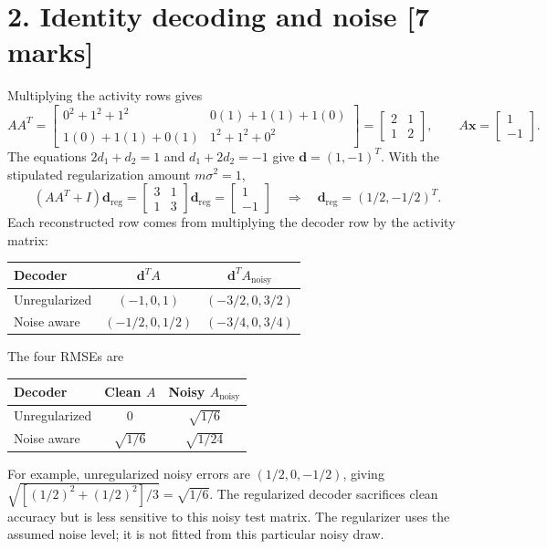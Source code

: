 \documentclass[10pt,letterpaper]{article}
\newcommand{\vct}[1]{\boldsymbol{#1}}
\begin{document}
\section*{2. Identity decoding and noise [7 marks]}
Multiplying the activity rows gives
\[
AA^T=\begin{bmatrix}0^2+1^2+1^2&0(1)+1(1)+1(0)\\1(0)+1(1)+0(1)&1^2+1^2+0^2\end{bmatrix}
=\begin{bmatrix}2&1\\1&2\end{bmatrix},\qquad
A\vct{x}=\begin{bmatrix}1\\-1\end{bmatrix}.
\]
The equations \(2d_1+d_2=1\) and \(d_1+2d_2=-1\) give \(\vct{d}=(1,-1)^T\). With the stipulated regularization amount \(m\sigma^2=1\),
\[
(AA^T+I)\vct{d}_{\mathrm{reg}}=
\begin{bmatrix}3&1\\1&3\end{bmatrix}\vct{d}_{\mathrm{reg}}
=\begin{bmatrix}1\\-1\end{bmatrix}
\quad\Longrightarrow\quad \vct{d}_{\mathrm{reg}}=(1/2,-1/2)^T.
\]
Each reconstructed row comes from multiplying the decoder row by the activity matrix:
\begin{center}\begin{tabular}{lcc}\toprule
Decoder & \(\vct{d}^T A\) & \(\vct{d}^T A_{\mathrm{noisy}}\)\\\midrule
Unregularized & \((-1,0,1)\) & \((-3/2,0,3/2)\)\\
Noise aware & \((-1/2,0,1/2)\) & \((-3/4,0,3/4)\)\\\bottomrule\end{tabular}\end{center}
The four RMSEs are
\begin{center}\begin{tabular}{lcc}\toprule Decoder & Clean \(A\) & Noisy \(A_{\mathrm{noisy}}\)\\\midrule
Unregularized & 0 & \(\sqrt{1/6}\)\\
Noise aware & \(\sqrt{1/6}\) & \(\sqrt{1/24}\)\\\bottomrule\end{tabular}\end{center}
For example, unregularized noisy errors are \((1/2,0,-1/2)\), giving \(\sqrt{[(1/2)^2+(1/2)^2]/3}=\sqrt{1/6}\). The regularized decoder sacrifices clean accuracy but is less sensitive to this noisy test matrix. The regularizer uses the assumed noise level; it is not fitted from this particular noisy draw.
\end{document}
